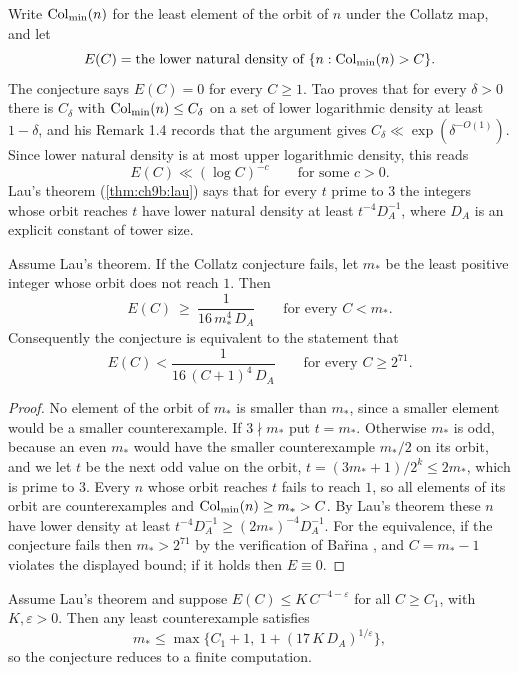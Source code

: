 Write $\mathrm{Col}_{\min}(n)$ for the least element of the orbit of $n$ under the Collatz map, and let
\[
E(C)=\text{the lower natural density of }\{n:\mathrm{Col}_{\min}(n)>C\}.
\]
The conjecture says $E(C)=0$ for every $C\ge1$. Tao \cite{tao2022} proves that for every $\delta>0$ there is $C_\delta$ with $\mathrm{Col}_{\min}(n)\le C_\delta$ on a set of lower logarithmic density at least $1-\delta$, and his Remark 1.4 records that the argument gives $C_\delta\ll\exp(\delta^{-O(1)})$. Since lower natural density is at most upper logarithmic density, this reads
\begin{equation}\label{rrt:eq:tao}
E(C)\ll(\log C)^{-c}\qquad\text{for some } c>0 .
\end{equation}
Lau's theorem (\cref{thm:ch9b:lau}) says that for every $t$ prime to $3$ the integers whose orbit reaches $t$ have lower natural density at least $t^{-4}D_A^{-1}$, where $D_A$ is an explicit constant of tower size.

\begin{theorem}\label{rrt:thm:tail}
Assume Lau's theorem. If the Collatz conjecture fails, let $m_*$ be the least positive integer whose orbit does not reach $1$. Then
\[
E(C)\ \ge\ \frac{1}{16\,m_*^{4}\,D_A}\qquad\text{for every } C<m_* .
\]
Consequently the conjecture is equivalent to the statement that
\[
E(C)<\frac{1}{16\,(C+1)^{4}\,D_A}\qquad\text{for every } C\ge 2^{71}.
\]
\end{theorem}

\begin{proof}
No element of the orbit of $m_*$ is smaller than $m_*$, since a smaller element would be a smaller counterexample. If $3\nmid m_*$ put $t=m_*$. Otherwise $m_*$ is odd, because an even $m_*$ would have the smaller counterexample $m_*/2$ on its orbit, and we let $t$ be the next odd value on the orbit, $t=(3m_*+1)/2^k\le 2m_*$, which is prime to $3$. Every $n$ whose orbit reaches $t$ fails to reach $1$, so all elements of its orbit are counterexamples and $\mathrm{Col}_{\min}(n)\ge m_*>C$. By Lau's theorem these $n$ have lower density at least $t^{-4}D_A^{-1}\ge(2m_*)^{-4}D_A^{-1}$. For the equivalence, if the conjecture fails then $m_*>2^{71}$ by the verification of Ba\v{r}ina \cite{barina2025}, and $C=m_*-1$ violates the displayed bound; if it holds then $E\equiv0$.
\end{proof}

\begin{corollary}\label{rrt:cor:poly}
Assume Lau's theorem and suppose $E(C)\le K\,C^{-4-\varepsilon}$ for all $C\ge C_1$, with $K,\varepsilon>0$. Then any least counterexample satisfies
\[
m_*\le\max\bigl\{C_1+1,\ 1+(17\,K\,D_A)^{1/\varepsilon}\bigr\},
\]
so the conjecture reduces to a finite computation.
\end{corollary}

